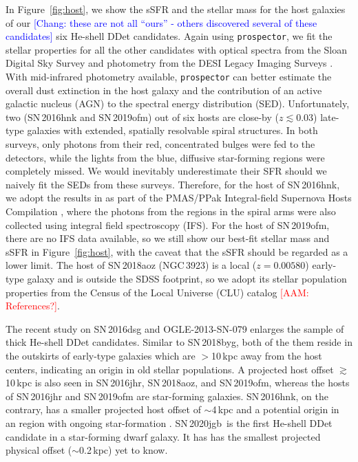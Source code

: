 \documentclass[twocolumn]{aastex631}
\newcommand{\sn}{SN\,2020jgb}
\newcommand{\adam}[1]{\textcolor{red}{[AAM: #1]}}
\newcommand{\chang}[1]{\textcolor{blue}{[Chang: #1]}}
\begin{document}
In Figure~\ref{fig:host}, we show the sSFR and the stellar mass for the host galaxies of our \chang{these are not all ``ours'' - others discovered several of these candidates} six He-shell DDet candidates. Again using \texttt{prospector}, we fit the stellar properties for all the other candidates with optical spectra from the Sloan Digital Sky Survey \citep[SDSS;][]{York_2000} and photometry from the DESI Legacy Imaging Surveys \citep[][{\it g, r, z, $W_1$, $W_2$, $W_3$, $W_4$} magnitudes]{Dey_2019}. With mid-infrared photometry available, \texttt{prospector} can better estimate the overall dust extinction in the host galaxy and the contribution of an active galactic nucleus (AGN) to the spectral energy distribution (SED). Unfortunately, two (SN\,2016hnk and SN\,2019ofm) out of six hosts are close-by ($z\lesssim 0.03$) late-type galaxies with extended, spatially resolvable spiral structures. In both surveys, only photons from their red, concentrated bulges were fed to the detectors, while the lights from the blue, diffusive star-forming regions were completely missed. We would inevitably underestimate their SFR should we naively fit the SEDs from these surveys. Therefore, for the host of SN\,2016hnk, we adopt the results in \citet{galbany_16hnk_2019} as part of the PMAS/PPak Integral-field Supernova Hosts Compilation \citep[PISCO;][]{Galbany_PISCO_2018}, where the photons from the  regions in the spiral arms were also collected using integral field spectroscopy (IFS). For the host of SN\,2019ofm, there are no IFS data available, so we still show our best-fit stellar mass and sSFR in Figure~\ref{fig:host}, with the caveat that the sSFR should be regarded as a lower limit. The host of SN\,2018aoz (NGC\,3923) is a local ($z=0.00580$) early-type galaxy and is outside the SDSS footprint, so we adopt its stellar population properties from the Census of the Local Universe (CLU) catalog \adam{References?}.

The recent study on SN\,2016dsg and OGLE-2013-SN-079 \citep{Dong_16dsg_2022} enlarges the sample of thick He-shell DDet candidates. Similar to SN\,2018byg, both of the them reside in the outskirts of early-type galaxies which are $>$10\,kpc away from the host centers, indicating an origin in old stellar populations. A projected host offset $\gtrsim$10\,kpc is also seen in SN\,2016jhr, SN\,2018aoz, and SN\,2019ofm, whereas the hosts of SN\,2016jhr and SN\,2019ofm are star-forming galaxies. SN\,2016hnk, on the contrary, has a smaller projected host offset of $\sim$4\,kpc and a potential origin in an  region with ongoing star-formation \citep{galbany_16hnk_2019}. \sn\ is the first He-shell DDet candidate in a star-forming dwarf galaxy. It has has the smallest projected physical offset ($\sim$0.2\,kpc) yet to know.
\end{document}
